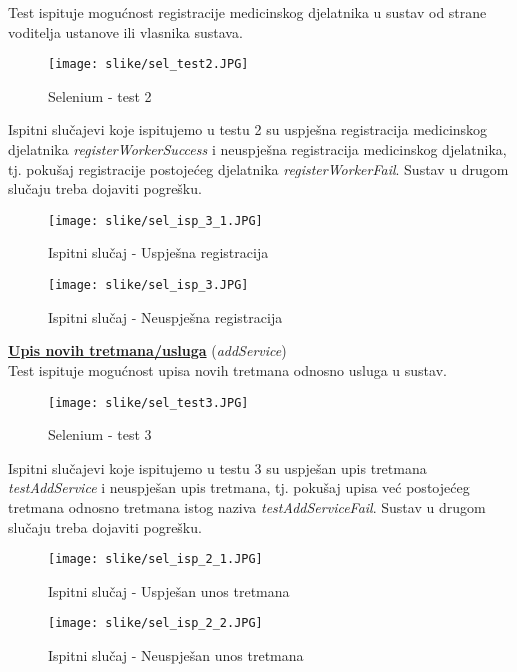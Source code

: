 			Test ispituje mogućnost registracije medicinskog djelatnika u sustav od strane voditelja ustanove ili vlasnika sustava.			
			\begin{figure}[H]
				\texttt{[image: slike/sel\_test2.JPG]} %
				\centering
				\caption{Selenium - test 2}
				\label{fig:promjene}
			\end{figure}
			Ispitni slučajevi koje ispitujemo u testu 2 su uspješna registracija medicinskog djelatnika \textit{registerWorkerSuccess} i neuspješna registracija medicinskog djelatnika, tj. pokušaj registracije postojećeg djelatnika \textit{registerWorkerFail}. Sustav u drugom slučaju treba dojaviti pogrešku.	
			\begin{figure}[H]
				\texttt{[image: slike/sel\_isp\_3\_1.JPG]} %
				\centering
				\caption{Ispitni slučaj - Uspješna registracija}
				\label{fig:promjene}
			\end{figure}
			\begin{figure}[H]
				\texttt{[image: slike/sel\_isp\_3.JPG]} %
				\centering
				\caption{Ispitni slučaj - Neuspješna registracija}
				\label{fig:promjene}
			\end{figure}
			\pagebreak
			\underline{\textbf{Upis novih tretmana/usluga}} (\textit{addService})\\
			Test ispituje mogućnost upisa novih tretmana odnosno usluga u sustav.			
			\begin{figure}[H]
				\texttt{[image: slike/sel\_test3.JPG]} %
				\centering
				\caption{Selenium - test 3}
				\label{fig:promjene}
			\end{figure}
			Ispitni slučajevi koje ispitujemo u testu 3 su uspješan upis tretmana \textit{testAddService} i neuspješan upis tretmana, tj. pokušaj upisa već postojećeg tretmana odnosno tretmana istog naziva \textit{testAddServiceFail}. Sustav u drugom slučaju treba dojaviti pogrešku.	
			\begin{figure}[H]
				\texttt{[image: slike/sel\_isp\_2\_1.JPG]} %
				\centering
				\caption{Ispitni slučaj - Uspješan unos tretmana}
				\label{fig:promjene}
			\end{figure}
			\begin{figure}[H]
				\texttt{[image: slike/sel\_isp\_2\_2.JPG]} %
				\centering
				\caption{Ispitni slučaj - Neuspješan unos tretmana}
				\label{fig:promjene}
			\end{figure}
